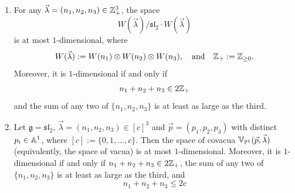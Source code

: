 \documentclass[12pt]{article}
\begin{document}
\begin{proposition}\label{prop:vacua-on-p1-sl2}
    \leavevmode
    \begin{enumerate}
        \item For any $\vec\lambda=(n_1,n_2,n_3)\in\Z_+^3$, the space
              \[
                  W(\vec\lambda)/\mathfrak{sl}_2\cdot W(\vec\lambda)
              \]
              is at most $1$-dimensional, where
              \[
                  W(\vec\lambda):=W(n_1)\otimes W(n_2)\otimes W(n_3),
                  \quad\text{and}\quad
                  \Z_+:=\Z_{\ge0}.
              \]
              Moreover, it is $1$-dimensional if and only if
              \begin{equation}\label{eq:cond1}
                  n_1+n_2+n_3\in2\Z_+
              \end{equation} and the sum of any two of $\{n_1,n_2,n_3\}$ is at least as large as the third.

        \item Let $\mathfrak g=\mathfrak{sl}_2$,
              $\vec\lambda=(n_1,n_2,n_3)\in[c]^3$ and
              $\vec p=(p_1,p_2,p_3)$ with distinct $p_i\in\A^1$, where
              $[c]:=\{0,1,\dots,c\}$.
              Then the space of covacua
              $\mathbb V_{\P^1}(\vec p,\vec\lambda)$
              (equivalently, the space of vacua) is at most $1$-dimensional.
              Moreover, it is $1$-dimensional if and only if $n_1+n_2+n_3 \in 2\Z_+$, the sum of any two of $\{n_1,n_2,n_3\}$ is at least as large as the third, and
              \begin{equation}\label{eq:cond2}
                  n_1+n_2+n_3 \le 2c
              \end{equation}
    \end{enumerate}
\end{proposition}
\end{document}
